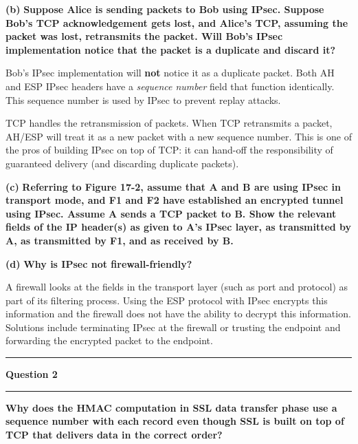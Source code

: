 \documentclass[11pt]{article}
\newcommand\question[2]{\vspace{.25in}\hrule\textbf{#1}\vspace{.5em}\hrule\vspace{.10in}}
\renewcommand\part[1]{\vspace{.10in}\textbf{(#1)}}
\begin{document}
\part{b} \textbf{Suppose Alice is sending packets to Bob using IPsec. Suppose Bob's TCP acknowledgement gets lost, and Alice's TCP, assuming the packet was lost, retransmits the packet. Will Bob's IPsec implementation notice that the packet is a duplicate and discard it?}

Bob's IPsec implementation will \textbf{not} notice it as a duplicate packet. Both AH and ESP IPsec headers have a \textit{sequence number} field that function identically. This sequence number is used by IPsec to prevent replay attacks.

TCP handles the retransmission of packets. When TCP retransmits a packet, AH/ESP will treat it as a new packet with a new sequence number. This is one of the pros of building IPsec on top of TCP: it can hand-off the responsibility of guaranteed delivery (and discarding duplicate packets).

\part{c} \textbf{Referring to Figure 17-2, assume that A and B are using IPsec in transport mode, and F1 and F2 have established an encrypted tunnel using IPsec. Assume A sends a TCP packet to B. Show the relevant fields of the IP header(s) as given to A's IPsec layer, as transmitted by A, as transmitted by F1, and as received by B.}

\part{d} \textbf{Why is IPsec not firewall-friendly?}

A firewall looks at the fields in the transport layer (such as port and protocol) as part of its filtering process. Using the ESP protocol with IPsec encrypts this information and the firewall does not have the ability to decrypt this information. Solutions include terminating IPsec at the firewall or trusting the endpoint and forwarding the encrypted packet to the endpoint.

\question{Question 2}

\part{a} \textbf{Why does the HMAC computation in SSL data transfer phase use a sequence number with each record even though SSL is built on top of TCP that delivers data in the correct order?}
\end{document}
